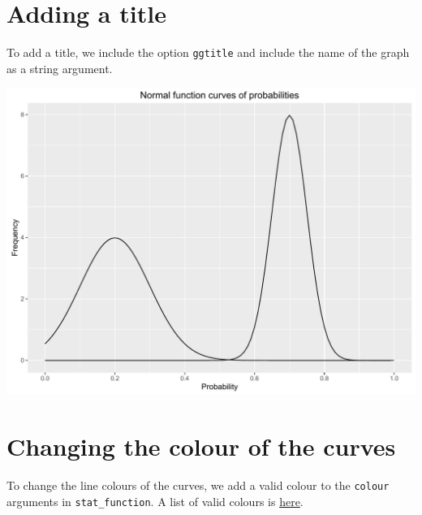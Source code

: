 \section{Adding a title}\label{adding-a-title-2}

To add a title, we include the option \texttt{ggtitle} and include the
name of the graph as a string argument.

\begin{Shaded}
\begin{Highlighting}[]
\StringTok{ }\StringTok{ }\NormalTok{(}\NormalTok{)}
\end{Highlighting}
\end{Shaded}

\begin{center}\includegraphics[width=0.55\linewidth]{figures/function_7-1} \end{center}

\section{Changing the colour of the
curves}\label{changing-the-colour-of-the-curves-1}

To change the line colours of the curves, we add a valid colour to the
\texttt{colour} arguments in \texttt{stat\_function}. A list of valid
colours is
\href{http://www.stat.columbia.edu/~tzheng/files/Rcolor.pdf}{here}.

